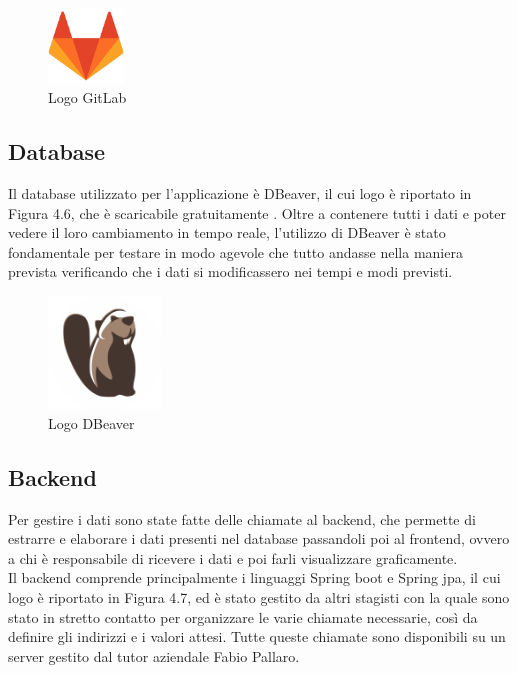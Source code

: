\begin{figure}[htbp]	
	\centering
	\includegraphics[width=2cm]{immagini/logogitlab.png}
	\caption{Logo GitLab}
	\label{fig:Logo GitLab}\end{figure}

\newpage

\subsection{Database}
Il database utilizzato per l'applicazione è DBeaver, il cui logo è riportato in Figura 4.6, che è scaricabile gratuitamente \cite{downdb}.
Oltre a contenere tutti i dati e poter vedere il loro cambiamento in tempo reale, l'utilizzo di DBeaver è stato fondamentale per testare in modo agevole che tutto andasse nella maniera prevista verificando che i dati si modificassero nei tempi e modi previsti.\\

\begin{figure}[htbp]	
	\centering
	\includegraphics[width=3cm]{immagini/logodbeaver.png}
	\caption{Logo DBeaver}
	\label{fig:Logo DBeaver}
\end{figure}

\subsection{Backend}
Per gestire i dati sono state fatte delle chiamate al backend, che permette di estrarre e elaborare i dati presenti nel database passandoli poi al frontend, ovvero a chi è responsabile di ricevere i dati e poi farli visualizzare graficamente.\\
Il backend comprende principalmente i linguaggi Spring boot e Spring jpa, il cui logo è riportato in Figura 4.7, ed è stato gestito da altri stagisti con la quale sono stato in stretto contatto per organizzare le varie chiamate necessarie, così da definire gli indirizzi e i valori attesi.
Tutte queste chiamate sono disponibili su un server gestito dal tutor aziendale Fabio Pallaro.\\

